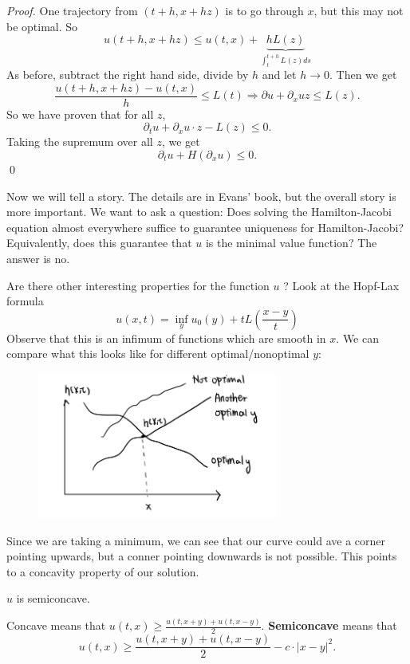 \begin{proof}
One trajectory from $(t+h, x+hz)$ is to go through $x$, but this may not be optimal. So 
\[
    u(t+h,x+hz)\le u(t,x) + \underbrace{hL(z)}_{\int_t^{t+h} L(z) ds}
\]
As before, subtract the right hand side, divide by $h$ and let $h\to 0$. Then we get 
\[
    \frac{u(t+h, x+h z)-u(t, x)}{h} \leq L(t) \Longrightarrow \partial u+\partial_{x} u z \leq L(z).  
\]
So we have proven that for all $z$,
\[
    \partial_{t} u+\partial_{x} u \cdot z -L(z)\leq 0.
\]
Taking the supremum over all $z$, we get 
\[
    \partial_{t} u+H\left(\partial_{x} u\right) \leq 0.
\]
\qed 
\end{proof}

Now we will tell a story. The details are in Evans' book, but the overall story is more important. We want to ask a question: Does solving the Hamilton-Jacobi equation almost everywhere suffice to guarantee uniqueness for Hamilton-Jacobi? Equivalently, does this guarantee that $u$ is the minimal value function? The answer is no.

Are there other interesting properties for the function $u$ ? Look at the Hopf-Lax formula
$$
u(x, t)=\inf_y u_{0}(y)+t L\left(\frac{x-y}{t}\right)
$$
Observe that this is an infimum of functions which are smooth in $x$. We can compare what this looks like for different optimal/nonoptimal $y$:

\begin{figure}[H]
    \centering
    \includegraphics[width=0.7\textwidth]{pics/10-2.png}
\end{figure}

Since we are taking a minimum, we can see that our curve could ave a corner pointing upwards, but a conner pointing downwards is not possible. This points to a concavity property of our solution.

\begin{proposition}
    $u$ is semiconcave.
\end{proposition}
Concave means that $u(t, x) \geq \frac{u(t, x+y)+u(t, x-y)}{2} .$ \textbf{Semiconcave} means that
$$
u(t, x) \geq \frac{u(t, x+y)+u(t, x-y)}{2}-c \cdot|x-y|^{2}.
$$

